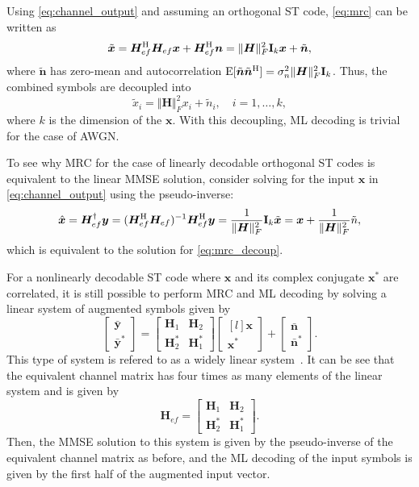 Using \eqref{eq:channel_output} and assuming an orthogonal ST code, \eqref{eq:mrc} can be written as
\[ \tilde{\bm{x}} = \bm{H}_{ef}^\text{H}\bm{H}_{ef}\bm{x} + \bm{H}_{ef}^\text{H}\bm{n} = \Vert\bm{H}\Vert_F^2 \mathbf{I}_k \bm{x} + \tilde{\bm{n}}, \]
where $\tilde{\bm{n}}$ has zero-mean and autocorrelation $\operatorname{E}[\tilde{\bm{n}}\tilde{\bm{n}}^\text{H}] = \sigma_n^2\Vert\bm{H}\Vert_F^2\mathbf{I}_k$. Thus, the combined symbols are decoupled into
\begin{equation}
  \tilde{x}_i = \Vert\bm{H}\Vert_F^2 x_i + \tilde{n}_i, \quad i=1,\dots,k,
  \label{eq:mrc_decoup}
\end{equation}
where $k$ is the dimension of the $\bm{x}$. With this decoupling, ML decoding is trivial for the case of AWGN.

To see why MRC for the case of linearly decodable orthogonal ST codes is equivalent to the linear MMSE solution, consider solving for the input $\bm{x}$ in \eqref{eq:channel_output} using the pseudo-inverse:
\[ \hat{\bm{x}} = \bm{H}_{ef}^\dagger \bm{y} = (\bm{H}_{ef}^\text{H}\bm{H}_{ef})^{-1}\bm{H}_{ef}^\text{H} \bm{y} = \frac{1}{\Vert\bm{H}\Vert_F^2} \mathbf{I}_k \tilde{\bm{x}} = \bm{x} + \frac{1}{\Vert\bm{H}\Vert_F^2} \tilde{n}, \]
which is equivalent to the solution for \eqref{eq:mrc_decoup}.

For a nonlinearly decodable ST code where $\bm{x}$ and its complex conjugate $\bm{x}^\ast$ are correlated, it is still possible to perform MRC and ML decoding by solving a linear system of augmented symbols given by
\[ \begin{bmatrix} \bar{\bm{y}} \\ \bar{\bm{y}}^\ast \end{bmatrix}
= \begin{bmatrix} \bm{H}_1 & \bm{H}_2 \\ \bm{H}_2^\ast & \bm{H}_1^\ast \end{bmatrix}
\begin{bmatrix*}[l] \bm{x} \\ \bm{x}^\ast\end{bmatrix*} + \begin{bmatrix} \bar{\bm{n}} \\ \bar{\bm{n}}^\ast \end{bmatrix} . \]
This type of system is refered to as a widely linear system~\cite{dama13,picinbono95}. It can be see that the equivalent channel matrix has four times as many elements of the linear system and is given by
\[ \bm{H}_{ef} = \begin{bmatrix} \bm{H}_1 & \bm{H}_2 \\ \bm{H}_2^\ast & \bm{H}_1^\ast \end{bmatrix}. \]
Then, the MMSE solution to this system is given by the pseudo-inverse of the equivalent channel matrix as before, and the ML decoding of the input symbols is given by the first half of the augmented input vector.

